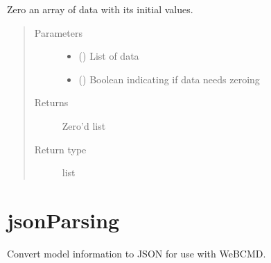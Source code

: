 \documentclass[letterpaper,10pt,english]{sphinxmanual}
\begin{document}
\begin{fulllineitems}
\label{\detokenize{abc:bayescmd.abc.distances.zero_array}}
Zero an array of data with its initial values.
\begin{quote}\begin{description}
\item[{Parameters}] \leavevmode\begin{itemize}
\item {} 
 () \textendash{} List of data

\item {} 
 () \textendash{} Boolean indicating if data needs zeroing

\end{itemize}

\item[{Returns}] \leavevmode
{} \textendash{} Zero’d list

\item[{Return type}] \leavevmode
list

\end{description}\end{quote}

\end{fulllineitems}



\chapter{jsonParsing}
\label{\detokenize{jsonParsing:module-bayescmd.jsonParsing.modelJSON}}\label{\detokenize{jsonParsing:jsonparsing}}\label{\detokenize{jsonParsing::doc}}
Convert model information to JSON for use with WeBCMD.
\end{document}
